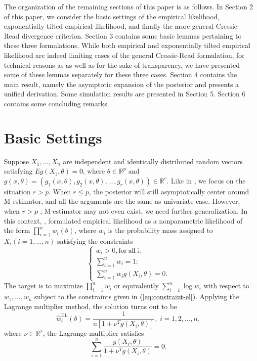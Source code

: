 \documentclass[oneside,english]{amsbook}
\numberwithin{section}{chapter}
\numberwithin{equation}{section}
\numberwithin{figure}{section}
\theoremstyle{plain}
\theoremstyle{plain}
\theoremstyle{definition}
\theoremstyle{plain}
\theoremstyle{plain}
\theoremstyle{remark}
\theoremstyle{definition}
\theoremstyle{definition}
\begin{document}
The organization of the remaining sections of this paper is as follows.
In Section 2 of this paper, we consider the basic settings of the
empirical likelihood, exponentially tilted empirical likelihood, and
finally the more general Cressie-Read divergence criterion. Section
3 contains some basic lemmas pertaining to these three formulations.
While both empirical and exponentially tilted empirical likelihood
are indeed limiting cases of the general Cressie-Read formulation,
for technical reasons as as well as for the sake of transparency,
we have presented some of these lemmas separately for these three
cases. Section 4 contains the main result, namely the asymptotic expansion
of the posterior and presents a unified derivation. Some simulation
results are presented in Section 5. Section 6 contains some concluding
remarks.


\section{Basic Settings}

Suppose $X_{1},\ldots,X_{n}$ are independent and identically distributed
random vectors satisfying $Eg\left(X_{1},\theta\right)=0$, where
$\theta\in\mathbb{R}^{p}$ and $g\left(x,\theta\right)=\left(g_{1}\left(x,\theta\right),g_{2}\left(x,\theta\right),\ldots,g_{r}\left(x,\theta\right)\right)\in\mathbb{R}^{r}$.
Like in \citet{qin1994empirical}, we focus on the situation $r>p$.
When $r\le p$, the posterior will still asymptotically center around
M-estimator, and all the arguments are the same as univariate case.
However, when $r>p$ , M-estimator may not even exist, we need further
generalization. In this context, \citet{owen1988empirical}, formulated
empirical likelihood as a nonparametric likelihood of the form $\prod_{i=1}^{n}w_{i}\left(\theta\right)$,
where $w_{i}$ is the probability mass assigned to $X_{i}\left(i=1,\ldots,n\right)$
satisfying the constraints 
\begin{equation}
\begin{cases}
w_{i}>0,\mathrm{for\: all\: i;}\\
\sum_{i=1}^{n}w_{i}=1;\\
\sum_{i=1}^{n}w_{i}g\left(X_{i},\theta\right)=0.
\end{cases}\label{eq:constraint-el}
\end{equation}
The target is to maximize $\prod_{i=1}^{n}w_{i}$ or equivalently
$\sum_{i=1}^{n}\log w_{i}$ with respect to $w_{1},\ldots,w_{n}$
subject to the constraints given in (\ref{eq:constraint-el}). Applying
the Lagrange multiplier method, the solution turns out to be 
\begin{equation}
\hat{w}_{i}^{\mathrm{EL}}\left(\theta\right)=\frac{1}{n\left[1+\nu^{T}g\left(X_{i},\theta\right)\right]},\; i=1,2,\ldots,n,\label{eq:sol-emp-lik}
\end{equation}
where $\nu\in\mathbb{R}^{r}$, the Lagrange multiplier satisfies 
\begin{equation}
\sum_{i=1}^{n}\frac{g\left(X_{i},\theta\right)}{1+\nu^{T}g\left(X_{i},\theta\right)}=0.\label{eq:lambda-eq}
\end{equation}
\end{document}
